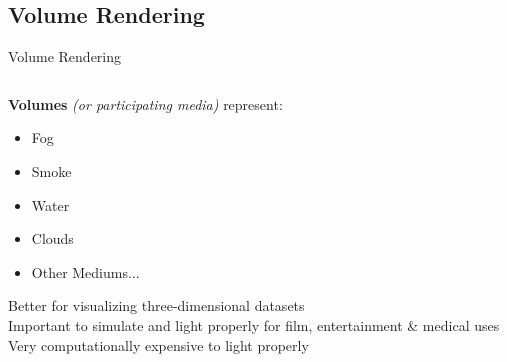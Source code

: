 \documentclass[10pt,compress,professionalfont]{beamer}
\begin{document}
\subsection{Volume Rendering}
\begin{frame}{Volume Rendering}

    \begin{columns}
        \begin{column}{0.6\textwidth}
            {\bf Volumes} \textit{(or participating media)} represent:\\
            \begin{itemize}
                \item Fog
                \item Smoke
                \item Water
                \item Clouds
                \item Other Mediums...
            \end{itemize}
            \vspace{4mm}
            Better for visualizing three-dimensional datasets\\
            \vspace{4mm}
            Important to simulate and light properly for film, entertainment \& medical uses\\
            \vspace{4mm}
            Very computationally expensive to light properly \\


\end{column}
\end{columns}
\end{frame}
\end{document}
